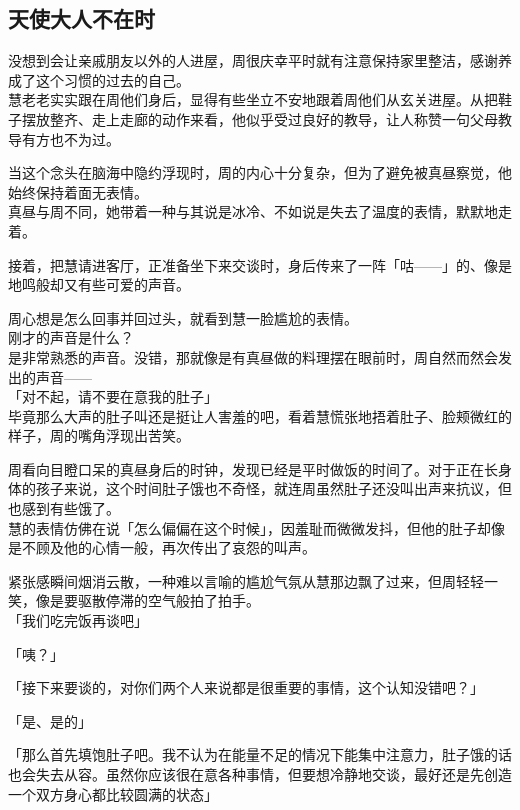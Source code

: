 \subsection{天使大人不在时}

没想到会让亲戚朋友以外的人进屋，周很庆幸平时就有注意保持家里整洁，感谢养成了这个习惯的过去的自己。\\

慧老老实实跟在周他们身后，显得有些坐立不安地跟着周他们从玄关进屋。从把鞋子摆放整齐、走上走廊的动作来看，他似乎受过良好的教导，让人称赞一句父母教导有方也不为过。

当这个念头在脑海中隐约浮现时，周的内心十分复杂，但为了避免被真昼察觉，他始终保持着面无表情。\\

真昼与周不同，她带着一种与其说是冰冷、不如说是失去了温度的表情，默默地走着。

接着，把慧请进客厅，正准备坐下来交谈时，身后传来了一阵「咕——」的、像是地鸣般却又有些可爱的声音。

周心想是怎么回事并回过头，就看到慧一脸尴尬的表情。\\

刚才的声音是什么？\\

是非常熟悉的声音。没错，那就像是有真昼做的料理摆在眼前时，周自然而然会发出的声音——\\

「对不起，请不要在意我的肚子」\\

毕竟那么大声的肚子叫还是挺让人害羞的吧，看着慧慌张地捂着肚子、脸颊微红的样子，周的嘴角浮现出苦笑。

周看向目瞪口呆的真昼身后的时钟，发现已经是平时做饭的时间了。对于正在长身体的孩子来说，这个时间肚子饿也不奇怪，就连周虽然肚子还没叫出声来抗议，但也感到有些饿了。\\

慧的表情仿佛在说「怎么偏偏在这个时候」，因羞耻而微微发抖，但他的肚子却像是不顾及他的心情一般，再次传出了哀怨的叫声。

紧张感瞬间烟消云散，一种难以言喻的尴尬气氛从慧那边飘了过来，但周轻轻一笑，像是要驱散停滞的空气般拍了拍手。\\

「我们吃完饭再谈吧」

「咦？」

「接下来要谈的，对你们两个人来说都是很重要的事情，这个认知没错吧？」

「是、是的」

「那么首先填饱肚子吧。我不认为在能量不足的情况下能集中注意力，肚子饿的话也会失去从容。虽然你应该很在意各种事情，但要想冷静地交谈，最好还是先创造一个双方身心都比较圆满的状态」\\

